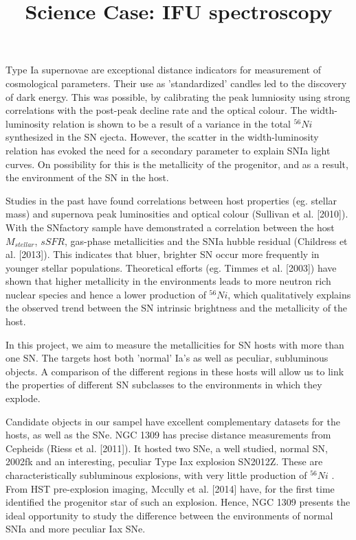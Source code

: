 \documentclass{article}
\begin{document}
\title{Science Case: IFU spectroscopy}
\maketitle
Type Ia supernovae are exceptional distance indicators for measurement of cosmological parameters. Their use as 'standardized' candles led to the discovery of dark energy. This was possible, by calibrating the peak lumniosity using strong correlations with the post-peak decline rate and the optical colour. The width-luminosity relation is shown to be a  result of a variance in the total $^{56}Ni$ synthesized in the SN ejecta. However, the scatter in the width-luminosity relation has evoked the need for a secondary parameter to explain SNIa light curves. On possibility for this is the metallicity of the progenitor, and as a result, the environment of the SN in the host. 

Studies in the past have found correlations between host properties  (eg. stellar mass) and supernova peak luminosities and optical colour (Sullivan et al. [2010]).  With the SNfactory sample have demonstrated a correlation between the host $M_{stellar}$, $sSFR$, gas-phase metallicities and the SNIa hubble residual (Childress et al. [2013]).
This indicates that bluer, brighter SN occur more frequently in younger stellar populations. Theoretical efforts (eg. Timmes et al. [2003]) have shown that higher metallicity in the environments leads to more neutron rich nuclear species and hence a lower production of 
$^{56}Ni$, which qualitatively explains the observed trend between the SN intrinsic brightness and the metallicity of the host. 

In this project, we aim to measure the metallicities for SN hosts with more than one SN. The targets host both 'normal' Ia's as well as peculiar, subluminous objects. A comparison of the different regions in these hosts will allow us to link the properties of different SN subclasses to the environments in which they explode. 

Candidate objects in our sampel have excellent complementary datasets for the hosts, as well as the SNe. NGC 1309 has precise distance measurements from Cepheids (Riess et al. [2011]). It hosted two
SNe, a well studied, normal SN, 2002fk and an interesting, peculiar Type Iax explosion SN2012Z. These are characteristically subluminous explosions, with very little production of $^{56}Ni$ . From HST pre-explosion imaging, Mccully et al. [2014] have, for the first time identified the progenitor star of such an explosion. Hence, NGC 1309 presents the ideal opportunity to study the difference between the environments of normal SNIa and more peculiar Iax SNe. 

\end{document}
